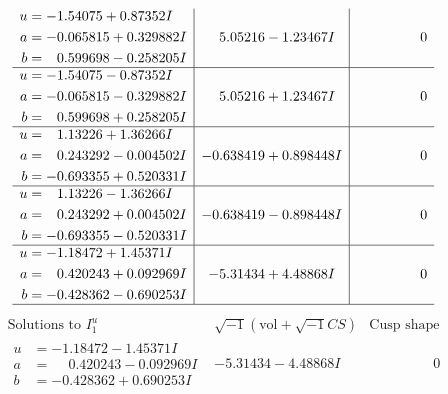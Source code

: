 \documentclass[1p]{elsarticle_modified}
\theoremstyle{definition}
\newcommand{\I}{\sqrt{-1}}
\begin{document}
$$\begin{array}{c|c|c}
\begin{aligned}
u &= -1.54075 + 0.87352 I \\
a &= -0.065815 + 0.329882 I \\
b &= \phantom{-}0.599698 - 0.258205 I\end{aligned}
 & \phantom{-}5.05216 - 1.23467 I & \phantom{-0.000000 } 0 \\ \hline\begin{aligned}
u &= -1.54075 - 0.87352 I \\
a &= -0.065815 - 0.329882 I \\
b &= \phantom{-}0.599698 + 0.258205 I\end{aligned}
 & \phantom{-}5.05216 + 1.23467 I & \phantom{-0.000000 } 0 \\ \hline\begin{aligned}
u &= \phantom{-}1.13226 + 1.36266 I \\
a &= \phantom{-}0.243292 - 0.004502 I \\
b &= -0.693355 + 0.520331 I\end{aligned}
 & -0.638419 + 0.898448 I & \phantom{-0.000000 } 0 \\ \hline\begin{aligned}
u &= \phantom{-}1.13226 - 1.36266 I \\
a &= \phantom{-}0.243292 + 0.004502 I \\
b &= -0.693355 - 0.520331 I\end{aligned}
 & -0.638419 - 0.898448 I & \phantom{-0.000000 } 0 \\ \hline\begin{aligned}
u &= -1.18472 + 1.45371 I \\
a &= \phantom{-}0.420243 + 0.092969 I \\
b &= -0.428362 - 0.690253 I\end{aligned}
 & -5.31434 + 4.48868 I & \phantom{-0.000000 } 0\\
 \hline 
 \end{array}$$\newpage$$\begin{array}{c|c|c}  
\text{Solutions to }I^u_{1}& \I (\text{vol} + \sqrt{-1}CS) & \text{Cusp shape}\\
 \hline 
\begin{aligned}
u &= -1.18472 - 1.45371 I \\
a &= \phantom{-}0.420243 - 0.092969 I \\
b &= -0.428362 + 0.690253 I\end{aligned}
 & -5.31434 - 4.48868 I & \phantom{-0.000000 } 0 \\ \hline\begin{aligned}

\end{aligned}
\end{array}$$
\end{document}
